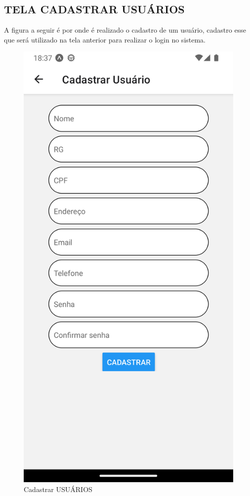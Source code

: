 \newpage

\subsection{TELA CADASTRAR USUÁRIOS}
A figura a seguir é por onde é realizado o cadastro de um usuário, cadastro esse que será utilizado na tela anterior para realizar o login no sistema.
\begin{figure}[htb]
	\caption{\label{fig_diagrama-classes} Cadastrar USUÁRIOS}
	\begin{center}
	    \includegraphics[width=0.5\linewidth]{imagens/tela-cadastrar-usuario.png}
	\end{center}
\end{figure}

\newpage

